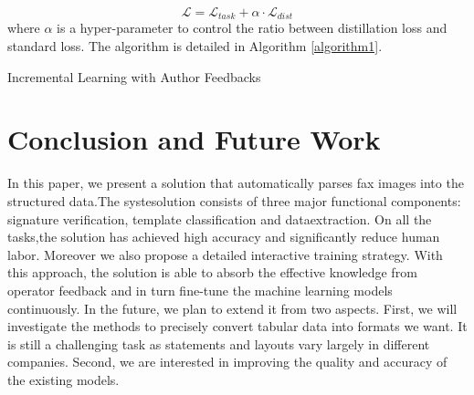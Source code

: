 \documentclass[sigconf]{acmart}
\begin{document}
\begin{equation}
\mathcal{L}=\mathcal{L}_{task} + \alpha\cdot\mathcal{L}_{dist}
\end{equation}
where $\alpha$ is a hyper-parameter to control the ratio between distillation loss and standard loss. The algorithm is detailed in Algorithm \ref{algorithm1}.


\begin{algorithm}[htb]
	\caption{Incremental Learning with Author Feedbacks}
	\label{algorithm1}
	\raggedright
	
\end{algorithm}

\section{Conclusion and Future Work}

In this paper, we present a solution that automatically parses fax images into the structured data.The systesolution consists of three major functional components: signature verification, template classification and dataextraction. On all the tasks,the solution has achieved high accuracy and significantly reduce human labor. Moreover we also propose a detailed interactive training strategy. With this approach, the solution is able to absorb the effective knowledge from operator feedback and in turn fine-tune the machine learning models continuously. In the future, we plan to extend it from two aspects. First, we will investigate the methods to precisely convert tabular data into formats we want. It is still a challenging task as statements and layouts vary largely in different companies. Second, we are interested in improving the quality and accuracy of the existing models. 



\end{document}
